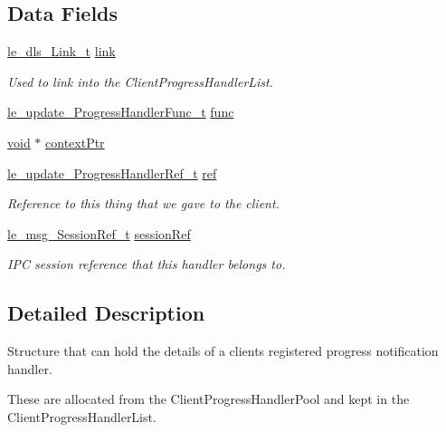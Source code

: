 \subsection*{Data Fields}
\begin{DoxyCompactItemize}
\item 
\hyperlink{structle__dls___link__t}{le\+\_\+dls\+\_\+\+Link\+\_\+t} \hyperlink{struct_client_progress_handler__t_a788f50c23ac8afedc2a0462744b74946}{link}
\begin{DoxyCompactList}\small\item\em Used to link into the Client\+Progress\+Handler\+List. \end{DoxyCompactList}\item 
\hyperlink{le__update__interface_8h_ae56667313f5ee9ee20c6ebc273aca3bb}{le\+\_\+update\+\_\+\+Progress\+Handler\+Func\+\_\+t} \hyperlink{struct_client_progress_handler__t_acc67896e499fd9dfa07dd0a890538581}{func}
\item 
\hyperlink{_t_e_m_p_l_a_t_e__cdef_8h_ac9c84fa68bbad002983e35ce3663c686}{void} $\ast$ \hyperlink{struct_client_progress_handler__t_a8b2e0d6f2fd0902eebe7b4865818fbd1}{context\+Ptr}
\item 
\hyperlink{le__update__interface_8h_a20a94b986a9ba0e6772b146f98b95f92}{le\+\_\+update\+\_\+\+Progress\+Handler\+Ref\+\_\+t} \hyperlink{struct_client_progress_handler__t_ac288bb21e037be4ca19142bf0b578cd0}{ref}
\begin{DoxyCompactList}\small\item\em Reference to this thing that we gave to the client. \end{DoxyCompactList}\item 
\hyperlink{le__messaging_8h_aebfc01e15b430a5b4f3038a5bd518904}{le\+\_\+msg\+\_\+\+Session\+Ref\+\_\+t} \hyperlink{struct_client_progress_handler__t_a181ce6c1d4a988342be426a5372519b2}{session\+Ref}
\begin{DoxyCompactList}\small\item\em I\+PC session reference that this handler belongs to. \end{DoxyCompactList}\end{DoxyCompactItemize}


\subsection{Detailed Description}
Structure that can hold the details of a client\textquotesingle{}s registered progress notification handler.

These are allocated from the Client\+Progress\+Handler\+Pool and kept in the Client\+Progress\+Handler\+List. 

